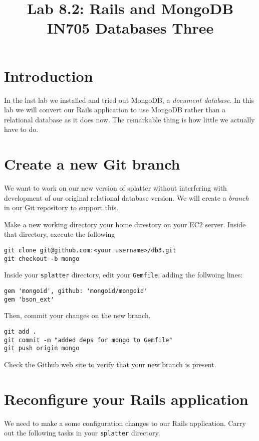 \documentclass{article}
\begin{document}
\title{Lab 8.2: Rails and MongoDB\\ IN705 Databases Three}
\date{}
\maketitle

\section*{Introduction}
In the last lab we installed and tried out MongoDB, a \emph{document database}.  In this lab we will convert
our Rails application to use MongoDB rather than a relational database as it does now.  The remarkable thing 
is how little we actually have to do.

\section{Create a new Git branch}
We want to work on our new version of splatter without interfering with development of our original relational database version.  We will create a \emph{branch} in our Git repository to support this.

Make a new working directory your home direstory on your EC2 server.  Inside that directory, execute the
following

\begin{verbatim}
git clone git@github.com:<your username>/db3.git
git checkout -b mongo
\end{verbatim}

Inside your \texttt{splatter} directory, edit your \texttt{Gemfile}, adding the follwoing lines:

\begin{verbatim}
gem 'mongoid', github: 'mongoid/mongoid'
gem 'bson_ext'
\end{verbatim}

Then, commit your changes on the new branch.

\begin{verbatim}
git add .
git commit -m "added deps for mongo to Gemfile"
git push origin mongo
\end{verbatim}

Check the Github web site to verify that your new branch is present.

\section{Reconfigure your Rails application}
We need to make a some configuration changes to our Rails application. Carry out the 
following tasks in your \texttt{splatter} directory.
\end{document}
